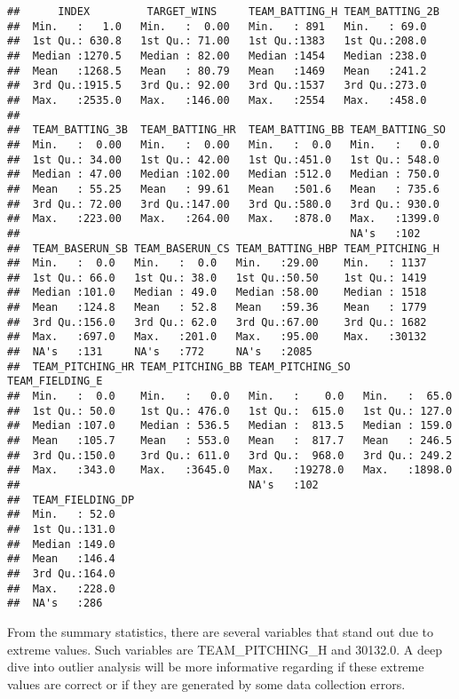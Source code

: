 \documentclass[]{article}
\begin{document}
\begin{verbatim}
##      INDEX         TARGET_WINS     TEAM_BATTING_H TEAM_BATTING_2B
##  Min.   :   1.0   Min.   :  0.00   Min.   : 891   Min.   : 69.0  
##  1st Qu.: 630.8   1st Qu.: 71.00   1st Qu.:1383   1st Qu.:208.0  
##  Median :1270.5   Median : 82.00   Median :1454   Median :238.0  
##  Mean   :1268.5   Mean   : 80.79   Mean   :1469   Mean   :241.2  
##  3rd Qu.:1915.5   3rd Qu.: 92.00   3rd Qu.:1537   3rd Qu.:273.0  
##  Max.   :2535.0   Max.   :146.00   Max.   :2554   Max.   :458.0  
##                                                                  
##  TEAM_BATTING_3B  TEAM_BATTING_HR  TEAM_BATTING_BB TEAM_BATTING_SO 
##  Min.   :  0.00   Min.   :  0.00   Min.   :  0.0   Min.   :   0.0  
##  1st Qu.: 34.00   1st Qu.: 42.00   1st Qu.:451.0   1st Qu.: 548.0  
##  Median : 47.00   Median :102.00   Median :512.0   Median : 750.0  
##  Mean   : 55.25   Mean   : 99.61   Mean   :501.6   Mean   : 735.6  
##  3rd Qu.: 72.00   3rd Qu.:147.00   3rd Qu.:580.0   3rd Qu.: 930.0  
##  Max.   :223.00   Max.   :264.00   Max.   :878.0   Max.   :1399.0  
##                                                    NA's   :102     
##  TEAM_BASERUN_SB TEAM_BASERUN_CS TEAM_BATTING_HBP TEAM_PITCHING_H
##  Min.   :  0.0   Min.   :  0.0   Min.   :29.00    Min.   : 1137  
##  1st Qu.: 66.0   1st Qu.: 38.0   1st Qu.:50.50    1st Qu.: 1419  
##  Median :101.0   Median : 49.0   Median :58.00    Median : 1518  
##  Mean   :124.8   Mean   : 52.8   Mean   :59.36    Mean   : 1779  
##  3rd Qu.:156.0   3rd Qu.: 62.0   3rd Qu.:67.00    3rd Qu.: 1682  
##  Max.   :697.0   Max.   :201.0   Max.   :95.00    Max.   :30132  
##  NA's   :131     NA's   :772     NA's   :2085                    
##  TEAM_PITCHING_HR TEAM_PITCHING_BB TEAM_PITCHING_SO  TEAM_FIELDING_E 
##  Min.   :  0.0    Min.   :   0.0   Min.   :    0.0   Min.   :  65.0  
##  1st Qu.: 50.0    1st Qu.: 476.0   1st Qu.:  615.0   1st Qu.: 127.0  
##  Median :107.0    Median : 536.5   Median :  813.5   Median : 159.0  
##  Mean   :105.7    Mean   : 553.0   Mean   :  817.7   Mean   : 246.5  
##  3rd Qu.:150.0    3rd Qu.: 611.0   3rd Qu.:  968.0   3rd Qu.: 249.2  
##  Max.   :343.0    Max.   :3645.0   Max.   :19278.0   Max.   :1898.0  
##                                    NA's   :102                       
##  TEAM_FIELDING_DP
##  Min.   : 52.0   
##  1st Qu.:131.0   
##  Median :149.0   
##  Mean   :146.4   
##  3rd Qu.:164.0   
##  Max.   :228.0   
##  NA's   :286
\end{verbatim}

From the summary statistics, there are several variables that stand out
due to extreme values. Such variables are TEAM\_PITCHING\_H and 30132.0.
A deep dive into outlier analysis will be more informative regarding if
these extreme values are correct or if they are generated by some data
collection errors.
\end{document}
